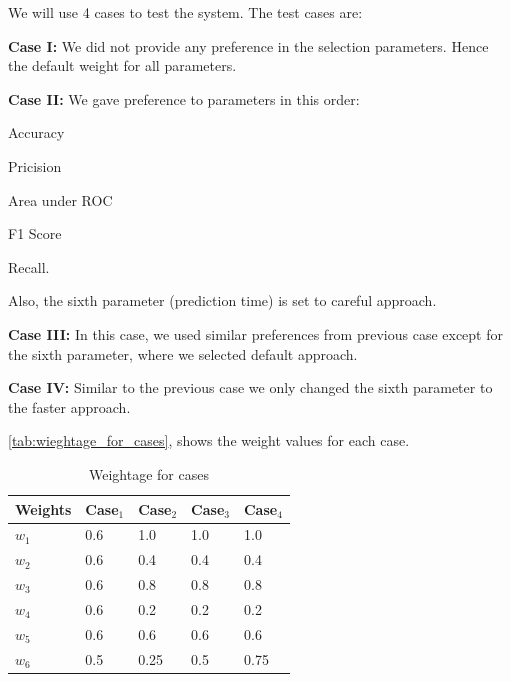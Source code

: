\documentclass[a4paper,fleqn]{cas-dc}
\begin{document}
We will use 4 cases to test the system. The test cases are:

\noindent
{\bfseries Case I:} We did not provide any preference in the selection parameters. Hence the default weight for all parameters.

\vspace*{0.5em}
\noindent
{\bfseries Case II:} We gave preference to parameters in this order:
        \begin{enumerate*}[label=\arabic{*}.]
            \item Accuracy
            \item Pricision
            \item Area under ROC
            \item F1 Score
            \item Recall.
        \end{enumerate*}

\noindent
Also, the sixth parameter (prediction time) is set to careful approach.

\vspace*{0.5em}
\noindent
{\bfseries Case III:} In this case, we used similar preferences from previous case except for the sixth parameter, where we selected default approach.

\vspace*{0.5em}
\noindent
{\bfseries Case IV:} Similar to the previous case we only changed the sixth parameter to the faster approach.

\vspace*{0.5em}
\autoref{tab:wieghtage_for_cases}, shows the weight values for each case.

\begin{table}[ht]
    \caption{Weightage for cases}\label{tab:wieghtage_for_cases}
    \begin{tabular*}{\tblwidth}{@{}LLLLL@{}}
        \toprule
        Weights & Case$_1$ & Case$_2$ & Case$_3$ & Case$_4$ \\
        \midrule
        $w_1$ & 0.6 & 1.0 & 1.0 & 1.0 \\
        $w_2$ & 0.6 & 0.4 & 0.4 & 0.4 \\
        $w_3$ & 0.6 & 0.8 & 0.8 & 0.8 \\
        $w_4$ & 0.6 & 0.2 & 0.2 & 0.2 \\
        $w_5$ & 0.6 & 0.6 & 0.6 & 0.6 \\
        $w_6$ & 0.5 & 0.25 & 0.5 & 0.75 \\
        \bottomrule
    \end{tabular*}
\end{table}
\end{document}
